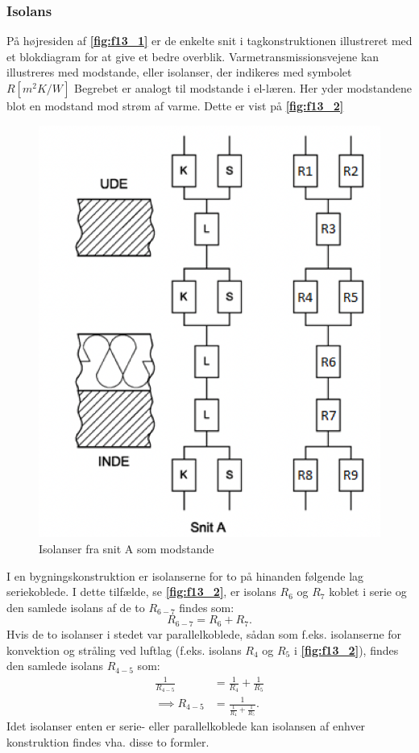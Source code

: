 \subsubsection{Isolans}
På højresiden af \textbf{\autoref{fig:f13_1}} er de enkelte snit i tagkonstruktionen illustreret med et blokdiagram for at give et bedre overblik. Varmetransmissionsvejene kan illustreres med modstande, eller isolanser, der indikeres med symbolet $R \left[ \unit{m^2 K / W} \right]$ Begrebet er analogt til modstande i el-læren. Her yder modstandene blot en modstand mod strøm af varme. Dette er vist på \textbf{\autoref{fig:f13_2}}
\begin{figure} [ht]
  \centering
  \includegraphics[width=0.5\linewidth]{./figures/f13_2.png}
  \caption{Isolanser fra snit A som modstande}
  \label{fig:f13_2}
\end{figure}

I en bygningskonstruktion er isolanserne for to på hinanden følgende lag seriekoblede. I dette tilfælde, se \textbf{\autoref{fig:f13_2}}, er isolans $R_6$ og $R_7$ koblet i serie og den samlede isolans af de to $R_{6-7}$ findes som:
\[ 
R_{6-7} = R_6 + R_7
.\]
Hvis de to isolanser i stedet var parallelkoblede, sådan som f.eks. isolanserne for konvektion og stråling ved luftlag (f.eks. isolans $R_4$ og $R_5$ i \textbf{\autoref{fig:f13_2}}), findes den samlede isolans $R_{4-5}$ som:
\begin{align*}
  \frac{1}{R_{4-5}} &= \frac{1}{R_4} + \frac{1}{R_5} \\
  \implies R_{4-5} &= \frac{1}{\frac{1}{R_4} + \frac{1}{R_5}}
.\end{align*}
Idet isolanser enten er serie- eller parallelkoblede kan isolansen af enhver konstruktion findes vha. disse to formler.


